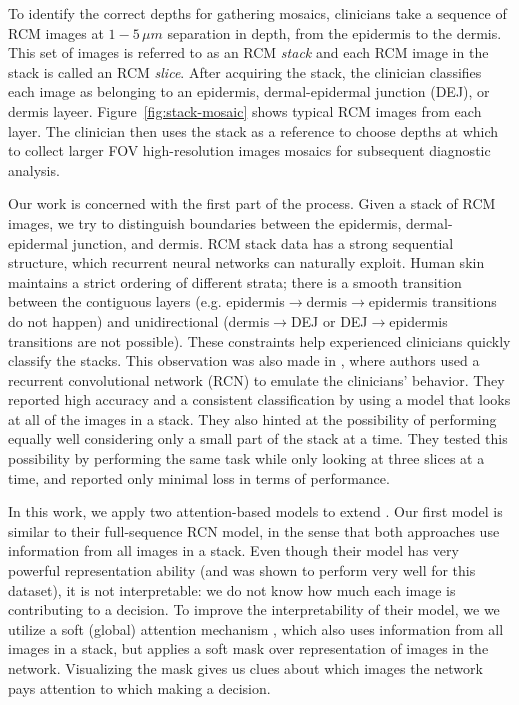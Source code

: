 \documentclass{article}
\begin{document}
To identify the correct depths for gathering mosaics, clinicians take a sequence of RCM images at $1 - 5\,\mu m$ separation in depth, from the epidermis to the dermis. This set of images is referred to as an RCM \textit{stack} and each RCM image in the stack is called an RCM \textit{slice}. After acquiring the stack, the clinician classifies each image as belonging to an epidermis, dermal-epidermal junction (DEJ), or dermis layeer. Figure~\ref{fig:stack-mosaic} shows typical RCM images from each layer. The clinician then uses the stack as a reference to choose depths at which to collect larger FOV high-resolution images mosaics for subsequent diagnostic analysis.

Our work is concerned with the first part of the process. Given a stack of RCM images, we try to distinguish boundaries between the epidermis, dermal-epidermal junction, and dermis. RCM stack data has a strong sequential structure, which recurrent neural networks can naturally exploit. Human skin maintains a strict ordering of different strata; there is a smooth transition between the contiguous layers (e.g. epidermis$\rightarrow$dermis$\rightarrow$epidermis transitions do not happen) and unidirectional (dermis$\rightarrow$DEJ or DEJ$\rightarrow$epidermis transitions are not possible). These constraints help experienced clinicians quickly classify the stacks. This observation was also made in \cite{bozkurt2017delineation}, where authors used a recurrent convolutional network (RCN) to emulate the clinicians' behavior. They reported high accuracy and a consistent classification by using a model that looks at all of the images in a stack. They also hinted at the possibility of performing equally well considering only a small part of the stack at a time. They tested this possibility by performing the same task while only looking at three slices at a time, and reported  only minimal loss in terms of performance.

In this work, we apply two attention-based models to extend \citep{bozkurt2017delineation}. Our first model is similar to their full-sequence RCN model, in the sense that both approaches use information from all images in a stack. Even though their model has very powerful representation ability (and was shown to perform very well for this dataset), it is not interpretable: we do not know how much each image is contributing to a decision. To improve the interpretability of their model, we we utilize a soft (global) attention mechanism \cite{bahdanau2014neural}, which also uses information from all images in a stack, but applies a soft mask over representation of images in the network. Visualizing the mask gives us clues about which images the network pays attention to which making a decision.    
\end{document}
